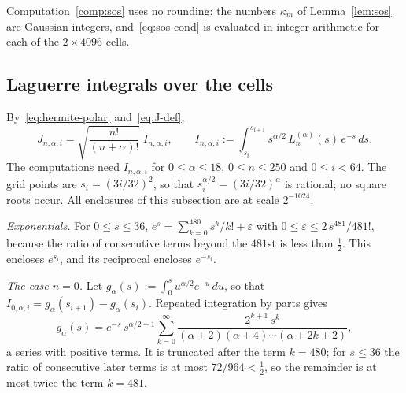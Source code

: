 \documentclass[11pt,reqno]{amsart}
\theoremstyle{definition}
\numberwithin{equation}{section}
\begin{document}
Computation~\ref{comp:sos} uses no rounding: the numbers $\kappa_m$ of Lemma~\ref{lem:sos} are Gaussian integers, and~\eqref{eq:sos-cond} is evaluated in integer arithmetic for each of the $2\times4096$ cells.

\subsection{Laguerre integrals over the cells}\label{app:laguerre}
By~\eqref{eq:hermite-polar} and~\eqref{eq:J-def},
\begin{equation}\label{eq:I-lag}
  J_{n,\alpha,i}=\sqrt{\frac{n!}{(n+\alpha)!}}\;I_{n,\alpha,i},\qquad I_{n,\alpha,i}:=\int_{s_i}^{s_{i+1}}s^{\alpha/2}\,L_n^{(\alpha)}(s)\,e^{-s}\,ds .
\end{equation}
The computations need $I_{n,\alpha,i}$ for $0\le\alpha\le18$, $0\le n\le250$ and $0\le i<64$. The grid points are $s_i=(3i/32)^2$, so that $s_i^{\alpha/2}=(3i/32)^\alpha$ is rational; no square roots occur. All enclosures of this subsection are at scale $2^{-1024}$.

\emph{Exponentials.} For $0\le s\le36$, $e^{s}=\sum_{k=0}^{480}s^k/k!+\varepsilon$ with $0\le\varepsilon\le2\,s^{481}/481!$, because the ratio of consecutive terms beyond the $481$st is less than $\frac12$. This encloses $e^{s_i}$, and its reciprocal encloses $e^{-s_i}$.

\emph{The case $n=0$.} Let $g_\alpha(s):=\int_0^su^{\alpha/2}e^{-u}\,du$, so that $I_{0,\alpha,i}=g_\alpha(s_{i+1})-g_\alpha(s_i)$. Repeated integration by parts gives
\[
  g_\alpha(s)=e^{-s}\,s^{\alpha/2+1}\sum_{k=0}^\infty\frac{2^{k+1}\,s^k}{(\alpha+2)(\alpha+4)\cdots(\alpha+2k+2)} ,
\]
a series with positive terms. It is truncated after the term $k=480$; for $s\le36$ the ratio of consecutive later terms is at most $72/964<\frac12$, so the remainder is at most twice the term $k=481$.
\end{document}
